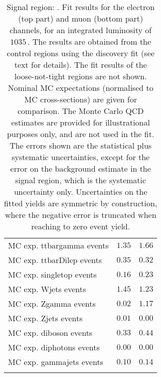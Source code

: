 \begin{table}
\begin{center}
{\begin{tabular*}{\textwidth}{@{\extracolsep{\fill}}lrr}
        MC exp. ttbargamma events         & $1.35$          & $1.66$              \\
        MC exp. ttbarDilep events         & $0.35$          & $0.32$              \\
        MC exp. singletop events         & $0.16$          & $0.23$              \\
        MC exp. Wjets events         & $1.45$          & $1.23$              \\
        MC exp. Zgamma events         & $0.02$          & $1.17$              \\
        MC exp. Zjets events         & $0.01$          & $0.00$              \\
        MC exp. diboson events         & $0.33$          & $0.44$              \\
        MC exp. diphotons events         & $0.00$          & $0.00$              \\
        MC exp. gammajets events         & $0.10$          & $0.14$              \\
\noalign{\smallskip}\hline\noalign{\smallskip}
\end{tabular*}
}
\end{center}
\caption{Signal region: . Fit results for the electron (top part) and muon (bottom part) channels, for an integrated luminosity of $1035$\,\ipb.
The results are obtained from the control regions using the discovery fit (see text for details). The fit results of the loose-not-tight regions are not shown.
Nominal MC expectations (normalised to MC cross-sections) are given for comparison. 
The Monte Carlo QCD estimates are provided for illustrational purposes only, and are not used in the fit.
The errors shown are the statistical plus systematic uncertainties, except for the error on the background estimate in the signal region, which is the systematic uncertainty only.
Uncertainties on the fitted yields are symmetric by construction, 
where the negative error is truncated when reaching to zero event yield.
}
\label{table.results.systematics.in.logL.fit.table.results.yields}
\end{table}
%